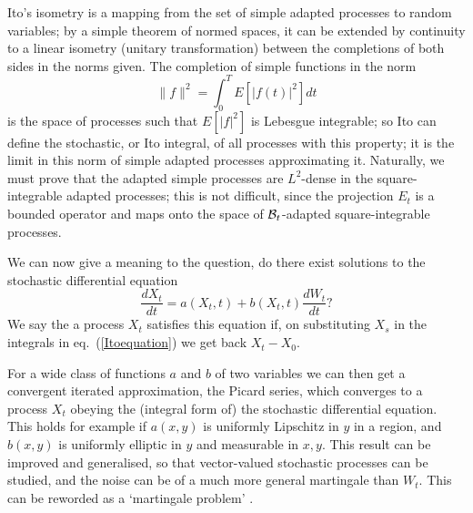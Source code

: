 Ito's isometry is a mapping from the set of simple adapted processes
to random variables; by a simple theorem of normed spaces, it
can be extended by continuity to a linear isometry
(unitary transformation) between the completions of both sides in the
norms given. The completion of simple functions in the norm
\begin{equation}
\|f\|^2=\int_0^TE[|f(t)|^2]dt
\end{equation}
is the space of processes such that $E[|f|^2]$ is Lebesgue integrable; so
Ito can define the stochastic, or Ito integral, of all processes with this
property; it is the limit in this norm of simple adapted processes
approximating it. Naturally, we must prove that the adapted simple processes
are $L^2$-dense in the square-integrable adapted processes; this is not
difficult, since the projection $E_t$ is a bounded operator and maps onto
the space of ${\cal B}_t$-adapted square-integrable processes.

We can now give a meaning to the question, do there exist solutions to the
stochastic differential equation
\begin{equation}
\frac{dX_t}{dt}=a(X_t,t)+b(X_t,t)\frac{dW_t}{dt}?
\label{sde}
\end{equation}
We say the a process $X_t$ satisfies this equation if, on substituting
$X_s$ in the integrals in eq.~(\ref{Itoequation}) we get back $X_t-X_0$.
 
For a wide class of functions $a$ and $b$ of two variables we can then
get a convergent iterated approximation, the Picard series, which converges
to a process $X_t$ obeying the (integral form of) the stochastic
differential equation. This holds for example if $a(x,y)$ is
uniformly Lipschitz in $y$ in a region, and $b(x,y)$ is uniformly elliptic
in $y$ and measurable in $x,y$.
This result can be improved and generalised, so
that vector-valued stochastic processes can be studied, and the noise
can be of a much more general martingale than $W_t$.
This can be reworded as a `martingale problem' \cite{Stroock}.


